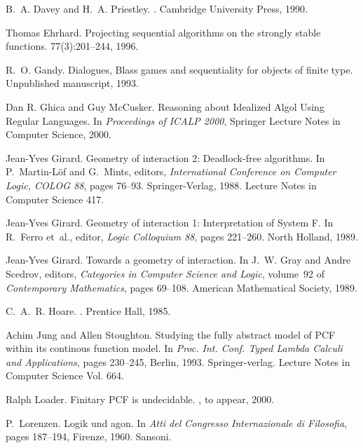 \documentclass[11pt]{article}
\begin{document}
\begin{thebibliography}{Cur92b}
B.~A. Davey and H.~A. Priestley.
.
\newblock Cambridge University Press, 1990.

Thomas Ehrhard.
\newblock Projecting sequential algorithms on the strongly stable functions.
77(3):201--244, 1996.

R.~O. Gandy.
\newblock Dialogues, {B}lass games and sequentiality for objects of finite
  type.
\newblock Unpublished manuscript, 1993.

Dan R. Ghica and Guy McCusker.
\newblock Reasoning about Idealized Algol Using Regular Languages.
\newblock In {\em Proceedings of ICALP 2000}, Springer Lecture Notes in
Computer Science, 2000.

Jean-Yves Girard.
\newblock Geometry of interaction 2: Deadlock-free algorithms.
\newblock In P.~Martin-L\"{o}f and G.~Mints, editors, {\em International
  Conference on Computer Logic, {COLOG} 88}, pages 76--93. Springer-Verlag,
  1988.
\newblock Lecture Notes in Computer Science 417.

Jean-Yves Girard.
\newblock Geometry of interaction 1: Interpretation of {S}ystem {F}.
\newblock In R.~Ferro et~al., editor, {\em Logic Colloquium 88}, pages
  221--260. North Holland, 1989.

Jean-Yves Girard.
\newblock Towards a geometry of interaction.
\newblock In J.~W. Gray and Andre Scedrov, editors, {\em Categories in Computer
  Science and Logic}, volume~92 of {\em Contemporary Mathematics}, pages
  69--108. American Mathematical Society, 1989.

C.~A.~R. Hoare.
.
\newblock Prentice Hall, 1985.

Achim Jung and Allen Stoughton.
\newblock Studying the fully abstract model of {PCF} within its continous
  function model.
\newblock In {\em Proc. Int. Conf. Typed Lambda Calculi and Applications},
  pages 230--245, Berlin, 1993. Springer-verlag.
\newblock Lecture Notes in Computer Science Vol. 664.

Ralph Loader.
\newblock Finitary PCF is undecidable.
, to appear, 2000.

P.~Lorenzen.
\newblock Logik und agon.
\newblock In {\em Atti del Congresso Internazionale di Filosofia}, pages
  187--194, Firenze, 1960. Sansoni.


\end{thebibliography}
\end{document}
